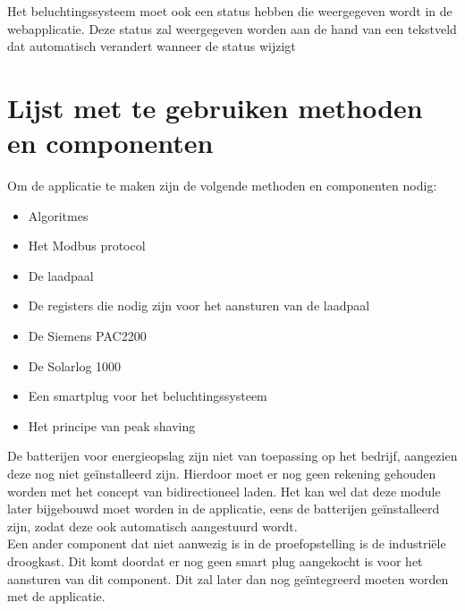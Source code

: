 Het beluchtingssysteem moet ook een status hebben die weergegeven wordt in de webapplicatie. Deze status zal weergegeven worden aan de hand van een tekstveld dat automatisch verandert wanneer de status wijzigt

\section{Lijst met te gebruiken methoden en componenten}
\label{sec:analyse-vereisten-lijst-met-te-gebruiken-methoden-en-componenten}

Om de applicatie te maken zijn de volgende methoden en componenten nodig:

\begin{itemize}
    \item Algoritmes
    \item Het Modbus protocol
    \item De laadpaal
    \item De registers die nodig zijn voor het aansturen van de laadpaal
    \item De Siemens PAC2200
    \item De Solarlog 1000
    \item Een smartplug voor het beluchtingssysteem
    \item Het principe van peak shaving
\end{itemize}

De batterijen voor energieopslag zijn niet van toepassing op het bedrijf, aangezien deze nog niet geïnstalleerd zijn. Hierdoor moet er nog geen rekening gehouden worden met het concept van bidirectioneel laden. Het kan wel dat deze module later bijgebouwd moet worden in de applicatie, eens de batterijen geïnstalleerd zijn, zodat deze ook automatisch aangestuurd wordt.\\

Een ander component dat niet aanwezig is in de proefopstelling is de industriële droogkast. Dit komt doordat er nog geen smart plug aangekocht is voor het aansturen van dit component. Dit zal later dan nog geïntegreerd moeten worden met de applicatie.